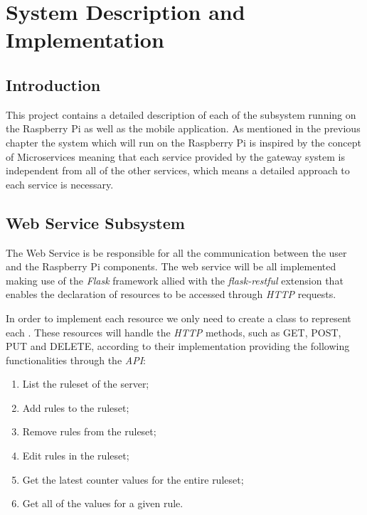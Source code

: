 \chapter{System Description and Implementation}
\label{chap:sys-desc}

\section{Introduction}
\label{chap4:sec:intro}
This project contains a detailed description of each of the subsystem running on
the Raspberry Pi as well as the mobile application. As mentioned in the previous
chapter the system which will run on the Raspberry Pi is inspired by the concept
of Microservices meaning that each service provided by the gateway system is
independent from all of the other services, which means a detailed approach to
each service is necessary.

\section{Web Service Subsystem}
\label{chap4:sec:web-sys}

The Web Service is be responsible for all the communication between the user and
the Raspberry Pi components. The web service will be all implemented making use
of the \emph{Flask} framework allied with the \emph{flask-restful} extension
that enables the declaration of resources to be accessed through
\emph{\ac{HTTP}} requests.

In order to implement each resource we only need to create a class to represent
each . These resources will handle the \emph{\ac{HTTP}} methods,
such as GET, POST, PUT and DELETE, according to their implementation providing
the following functionalities through the \emph{\ac{API}}:
\begin{enumerate}
	\item List the ruleset of the server;
	\item Add rules to the ruleset;
	\item Remove rules from the ruleset;
	\item Edit rules in the ruleset;
	\item Get the latest counter values for the entire ruleset;
	\item Get all of the values for a given rule.
\end{enumerate}

